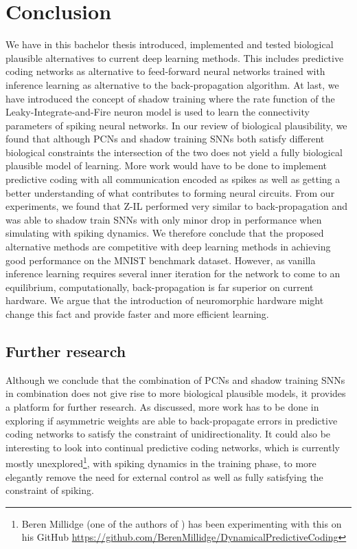 \documentclass[a4paper,11pt]{article}
\begin{document}
\section{Conclusion}
We have in this bachelor thesis introduced, implemented and tested biological plausible alternatives to current deep learning methods. This includes predictive coding networks as alternative to feed-forward neural networks trained with inference learning as alternative to the back-propagation algorithm. At last, we have introduced the concept of shadow training where the rate function of the Leaky-Integrate-and-Fire neuron model is used to learn the connectivity parameters of spiking neural networks. In our review of biological plausibility, we found that although PCNs and shadow training SNNs both satisfy different biological constraints the intersection of the two does not yield a fully biological plausible model of learning. More work would have to be done to implement predictive coding with all communication encoded as spikes as well as getting a better understanding of what contributes to forming neural circuits. From our experiments, we found that Z-IL performed very similar to back-propagation and was able to shadow train SNNs with only minor drop in performance when simulating with spiking dynamics. We therefore conclude that the proposed alternative methods are competitive with deep learning methods in achieving good performance on the MNIST benchmark dataset. However, as vanilla inference learning requires several inner iteration for the network to come to an equilibrium, computationally, back-propagation is far superior on current hardware. We argue that the introduction of neuromorphic hardware might change this fact and provide faster and more efficient learning. 

\subsection{Further research}
Although we conclude that the combination of PCNs and shadow training SNNs in combination does not give rise to more biological plausible models, it provides a platform for further research. As discussed, more work has to be done in exploring if asymmetric weights are able to back-propagate errors in predictive coding networks to satisfy the constraint of unidirectionality. It could also be interesting to look into continual predictive coding networks, which is currently mostly unexplored\footnote{
  Beren Millidge (one of the authors of \cite{milladge2020predictive}) has been experimenting with this on his GitHub \href{https://github.com/BerenMillidge/DynamicalPredictiveCoding}{https://github.com/BerenMillidge/DynamicalPredictiveCoding}
}, with spiking dynamics in the training phase, to more elegantly remove the need for external control as well as fully satisfying the constraint of spiking. 

\newpage


\end{document}
